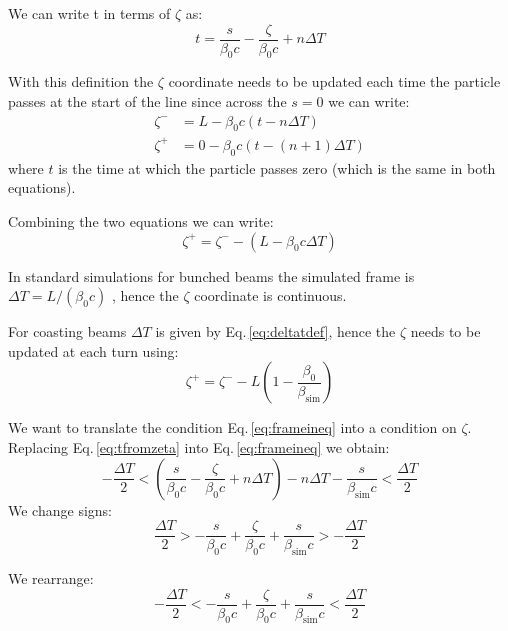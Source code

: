 We can write t in terms of $\zeta$ as:
\begin{equation}
 t = \frac{s}{\beta_0 c}  - \frac{\zeta}{\beta_0 c} + n\Delta T
 \label{eq:tfromzeta}
\end{equation}

With this definition the $\zeta$ coordinate needs to be updated each time the particle passes at the start of the line since across the $s=0$ we can write:
\begin{align}
\zeta^- &= L - \beta_0 c (t - n\Delta T)\\
\zeta^+ &= 0 - \beta_0 c (t - (n+1)\Delta T)
\end{align}
where $t$ is the time at which the particle passes zero (which is the same in both equations).

Combining the two equations we can write:
\begin{equation}
\zeta^+ = \zeta^- - (L - \beta_0 c \Delta T)
\end{equation}

In standard simulations for bunched beams the simulated frame is $\Delta T = L / (\beta_0 c)$ , hence the $\zeta$ coordinate is continuous. 

For coasting beams $\Delta T$ is given by Eq.\,\ref{eq:deltatdef}, hence the $\zeta$ needs to be updated at each turn using:
\begin{equation}
\boxed{
\zeta^+ = \zeta^- - L\left(1 - \frac{\beta_0}{\beta_\text{sim}} \right)
}
\end{equation}

We want to translate the condition Eq.\,\ref{eq:frameineq} into a condition on $\zeta$. Replacing Eq.\,\ref{eq:tfromzeta} into Eq.\,\ref{eq:frameineq} we obtain:
\begin{equation}
- \frac{\Delta T}{2} < \left(\frac{s}{\beta_0 c}  - \frac{\zeta}{\beta_0 c} + n \Delta T\right) - n \Delta T - \frac{s}{\beta_\text{sim} c} < \frac{\Delta T}{2}
\end{equation}
We change signs:
\begin{equation}
\frac{\Delta T}{2} > -\frac{s}{\beta_0 c}  + \frac{\zeta}{\beta_0 c} + \frac{s}{\beta_\text{sim} c} > -\frac{\Delta T}{2}
\end{equation}

We rearrange:
\begin{equation}
-\frac{\Delta T}{2} < -\frac{s}{\beta_0 c}  + \frac{\zeta}{\beta_0 c} + \frac{s}{\beta_\text{sim} c} < \frac{\Delta T}{2}
\end{equation}

